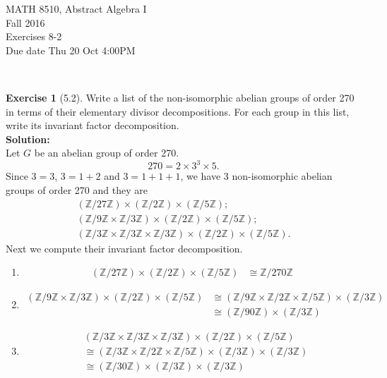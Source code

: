 \documentclass{amsart}
\newcommand{\bbz}{\mathbb{Z}}
\theoremstyle{plain}
\theoremstyle{definition}
\newtheorem{exer}[lem]{Exercise}
\begin{document}
\noindent MATH 8510, Abstract Algebra I \\
Fall 2016\\
Exercises 8-2\\
Due date Thu 20 Oct 4:00PM

\

%
%

\begin{exer}[5.2]
Write a list of the non-isomorphic abelian groups of order 270 in terms of their elementary divisor decompositions. 
For each group in this list, write its invariant factor decomposition. \\
\textbf{Solution:}\\
Let $G$ be an abelian group of order 270.
\[270 = 2 \times 3^3\times 5.\] 
Since $3=3$, $3=1+2$ and $3=1+1+1$,
we have 3 non-isomorphic abelian groups of order 270 and they are
\begin{gather*}
(\bbz/27\bbz) \times (\bbz/2\bbz) \times (\bbz/5\bbz);\\
\left( \bbz/9\bbz \times \bbz/3\bbz \right)\times (\bbz/2\bbz) \times (\bbz/5\bbz);\\
\left( \bbz/3\bbz \times \bbz/3\bbz \times \bbz/3\bbz \right)\times (\bbz/2\bbz) \times (\bbz/5\bbz).
\end{gather*}
Next we compute their invariant factor decomposition.
\begin{enumerate}[(1)]
	\item
	  \begin{align*}
	 	(\bbz/27\bbz) \times (\bbz/2\bbz) \times (\bbz/5\bbz) &\cong \bbz/270\bbz      		
	  \end{align*}
	\item
	  \begin{align*}
	  	\left( \bbz/9\bbz \times \bbz/3\bbz \right)\times (\bbz/2\bbz) \times (\bbz/5\bbz) &\cong  \left( \bbz/9\bbz \times \bbz/2\bbz \times \bbz/5\bbz \right)\times (\bbz/3\bbz) \\
	  			&\cong \left( \bbz/90\bbz \right)\times (\bbz/3\bbz)
	  \end{align*}
	\item
	\begin{align*}
	  &\left( \bbz/3\bbz \times \bbz/3\bbz \times \bbz/3\bbz \right)\times (\bbz/2\bbz) \times (\bbz/5\bbz) \\
	  &\cong  \left( \bbz/3\bbz \times \bbz/2\bbz \times \bbz/5\bbz \right) \times (\bbz/3\bbz) \times (\bbz/3\bbz)  \\
	  &\cong \left( \bbz/30\bbz \right)\times (\bbz/3\bbz) \times (\bbz/3\bbz) 
	\end{align*}
\end{enumerate}
\end{exer}
\end{document}
